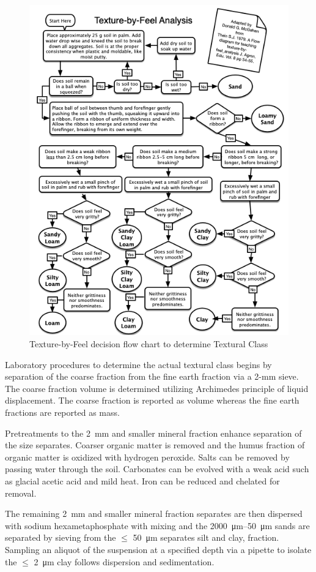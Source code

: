 \documentclass{book}
\begin{document}
\begin{figure}
    \includegraphics[width=0.9\columnwidth]{images/TextureFlowChart.png}
    \caption{Texture-by-Feel decision flow chart to determine Textural Class}
    \label{fig:TextureByFeelFlowChart}
\end{figure}

Laboratory procedures to determine the actual textural class begins by separation of the coarse fraction from the fine earth fraction via a 2-mm sieve. The coarse fraction volume is determined utilizing Archimedes principle of liquid displacement. The coarse fraction is reported as volume whereas the fine earth fractions are reported as mass.

Pretreatments to the 2~mm and smaller mineral fraction enhance separation of the size separates. Coarser organic matter is removed and the humus fraction of organic matter is oxidized with hydrogen peroxide. Salts can be removed by passing water through the soil. Carbonates can be evolved with a weak acid such as glacial acetic acid and mild heat. Iron can be reduced and chelated for removal.

The remaining \qty{2}{mm} and smaller mineral fraction separates are then dispersed with sodium hexametaphosphate with mixing and the \qtyrange{2000}{50}{\micro\metre} sands are separated by sieving from the $\leq$ \qty{50}{\micro\metre} separates silt and clay, fraction. Sampling an aliquot of the suspension at a specified depth via a pipette to isolate the $\leq$ \qty{2}{\micro\metre} clay follows dispersion and sedimentation.
\end{document}
